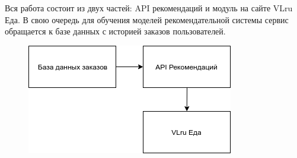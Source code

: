 Вся работа состоит из двух частей: API рекомендаций и модуль на сайте VLru Еда.
В свою очередь для обучения моделей рекомендательной системы сервис обращается к
базе данных с историей заказов пользователей.
\begin{figure}[H]
  \centering
  \includegraphics{images/sub_modules.png}
\end{figure}
